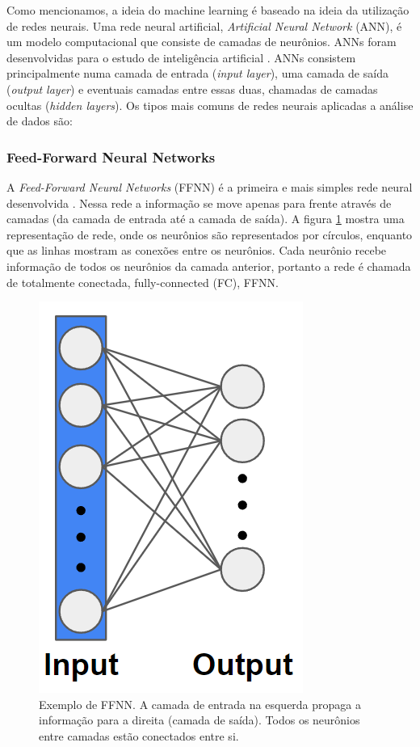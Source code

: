 \documentclass[a4paper,12pt,oneside]{book}
\begin{document}
\par Como mencionamos, a ideia do machine learning é baseado na ideia da utilização de redes neurais. Uma rede neural artificial, \textit{Artificial Neural Network} (ANN), é um modelo computacional que consiste de camadas de neurônios. ANNs foram desenvolvidas para o estudo de inteligência artificial \cite{mlbook, mldiverso}. ANNs consistem principalmente numa camada de entrada (\textit{input layer}), uma camada de saída (\textit{output layer}) e eventuais camadas entre essas duas, chamadas de camadas ocultas (\textit{hidden layers}). Os tipos mais comuns de redes neurais aplicadas a análise de dados são:

\subsubsection*{Feed-Forward Neural Networks}

\par A \textit{Feed-Forward Neural Networks} (FFNN) é a primeira e mais simples rede neural desenvolvida \cite{talent_ml, bishop2016pattern}. Nessa rede a informação se move apenas para frente através de camadas (da camada de entrada até a camada de saída). A figura \ref{fig:FFNN} mostra uma representação de rede, onde os neurônios são representados por círculos, enquanto que as linhas mostram as conexões entre os neurônios. Cada neurônio recebe informação de todos os neurônios da camada anterior, portanto a rede é chamada de totalmente conectada, fully-connected (FC), FFNN.

\begin{figure}[H]
    \centering
    \includegraphics[scale = 0.55]{figs/FFNN.png}
    \caption{Exemplo de FFNN. A camada de entrada na esquerda propaga a informação para a direita (camada de saída). Todos os neurônios entre camadas estão conectados entre si.}
    \label{fig:FFNN}
\end{figure}
\end{document}
